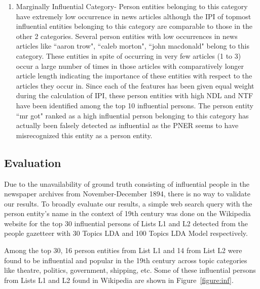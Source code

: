\documentclass[10pt,journal,compsoc]{IEEEtran}
\begin{document}
\begin{enumerate}
\item
Marginally Influential Category- Person entities belonging to this category have extremely low occurrence in news articles although the IPI of topmost influential entities belonging to this category are comparable to those in the other 2 categories.
Several person entities with low occurrences in news articles like ``aaron trow", ``caleb morton", ``john macdonald"  belong to this category. These entities in spite of occurring in very few articles (1 to 3) occur a large number of times in those articles with comparatively longer article length indicating the importance of these entities with respect to the articles they occur in. Since each of the features has been given equal weight during the calculation of IPI,  these person entities with high NDL and NTF have been identified among the top 10 influential persons. 
 The person entity ``mr got" ranked as a high influential person belonging to this category has actually been falsely detected as influential as the PNER seems to have misrecognized this entity as a person entity.  

\end{enumerate} 


\subsection{Evaluation}

Due to the unavailability of ground truth consisting of influential people in the newspaper archives from November-December 1894, there is no way to validate our results. 
To broadly evaluate our results, a simple web search query with the person entity's name in the context of 19th century was done on the Wikipedia website for the top 30 influential persons of Lists L1 and L2 detected from the people gazetteer with 30 Topics LDA and 100 Topics LDA Model respectively.

Among the top 30, 16 person entities from List L1 and 14 from List L2 were found to be influential and popular in the 19th century across topic categories like theatre, politics, government, shipping, etc. Some of these influential persons from Lists L1 and L2 found in Wikipedia are shown in Figure~\ref{figure:inf}. 
\end{document}
